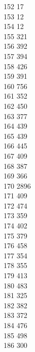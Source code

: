 { 152	17 \\
 153	12 \\
 154	12 \\
 155	321 \\
 156	392 \\
 157	394 \\
 158	426 \\
 159	391 \\
 160	756 \\
 161	352 \\
 162	450 \\
 163	377 \\
 164	439 \\
 165	439 \\
 166	445 \\
 167	409 \\
 168	387 \\
 169	366 \\
 170	2896 \\
 171	409 \\
 172	474 \\
 173	359 \\
 174	402 \\
 175	379 \\
 176	458 \\
 177	354 \\
 178	355 \\
 179	413 \\
 180	483 \\
 181	325 \\
 182	382 \\
 183	372 \\
 184	476 \\
 185	498 \\
 186	300 \\
}

